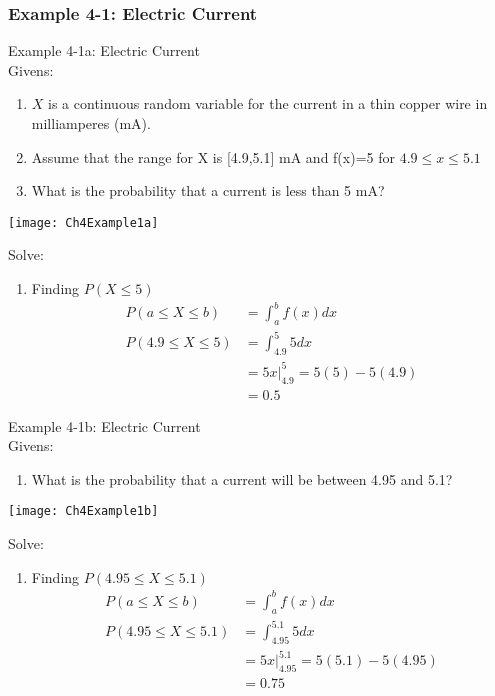 \documentclass[../INDE315.tex]{subfiles}
\begin{document}
\subsubsection*{Example 4-1: Electric Current}
\begin{exmp} Example 4-1a: Electric Current \\
    Givens:
    \begin{enumerate}
        \item $X$ is a continuous random variable for the current in a thin copper wire in milliamperes (mA).
        \item Assume that the range for X is [4.9,5.1] mA and f(x)=5 for $4.9 \leq x \leq 5.1$
        \item What is the probability that a current is less than 5 mA?
    \end{enumerate}
    \begin{center}
        \texttt{[image: Ch4Example1a]}
    \end{center}
\end{exmp} 
Solve:
\begin{enumerate}
    \item Finding $P(X \leq 5)$
        \begin{equation*}
            \begin{aligned}
                P(a \leq X \leq b) &= \int _a ^b f(x) dx \\
                P(4.9 \leq X \leq 5) &= \int _{4.9} ^{5} 5 dx \\
                            &= \left. 5x \right|^{5}_{4.9} = 5(5) - 5(4.9) \\
                            &= 0.5
            \end{aligned}
        \end{equation*}
\end{enumerate}
\begin{exmp} Example 4-1b: Electric Current \\
    Givens:
    \begin{enumerate}
        \item What is the probability that a current will be between 4.95 and 5.1?
    \end{enumerate}
    \begin{center}
        \texttt{[image: Ch4Example1b]}
    \end{center}
\end{exmp}
Solve: 
\begin{enumerate}
    \item Finding $P(4.95 \leq X \leq 5.1)$
        \begin{equation*}
            \begin{aligned}
                P(a \leq X \leq b) &= \int _a ^b f(x) dx \\
                P(4.95 \leq X \leq 5.1) &= \int _{4.95} ^{5.1} 5 dx \\
                            &= \left. 5x \right|^{5.1}_{4.95} = 5(5.1) - 5(4.95) \\
                            &= 0.75
            \end{aligned}
        \end{equation*}
\end{enumerate}
\end{document}

